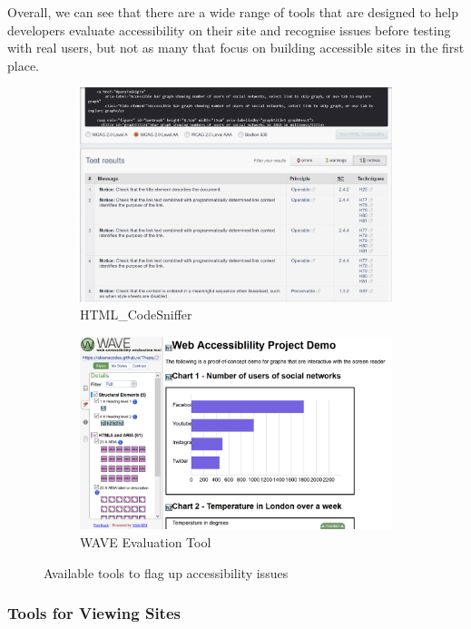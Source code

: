 \documentclass[ %
                    author={Aleena Baig},
                supervisor={Dr Simon Lock},
                    degree={BSc},
                     title={On Making Web Accessible Graphs},
                  subtitle={},
                      year={2019} ]{dissertation}
\begin{document}
Overall, we can see that there are a wide range of tools that are designed to help developers evaluate accessibility on their site and recognise issues before testing with real users, but not as many that focus on building accessible sites in the first place.

\begin{figure}[h]
  \centering
  \begin{subfigure}[b]{0.4\linewidth}
    \includegraphics[width=0.9\linewidth]{images/HTMLCodeSniffer.PNG}
     \caption{HTML\_CodeSniffer}
  \end{subfigure}
  \begin{subfigure}[b]{0.4\linewidth}
    \includegraphics[width=\linewidth]{images/WAVETool.PNG}
    \caption{WAVE Evaluation Tool}
  \end{subfigure}
  \caption{Available tools to flag up accessibility issues}
  \label{fig:EvaluationTools}
\end{figure}

\subsubsection{Tools for Viewing Sites}
\end{document}
